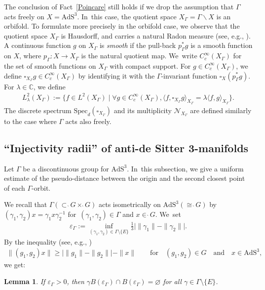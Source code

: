 \documentclass[10pt,a4paper]{amsart}
\numberwithin{equation}{section}
\newtheorem{Lemma}[Theorem]{Lemma}
\begin{document}
The conclusion of Fact~\ref{Poincare} still holds if
we drop the assumption that
$\Gamma$ acts freely on $X=\mathrm{AdS}^{3}$. In~this case, the quotient space $X_{\Gamma}=\Gamma\backslash X$ is an orbifold.
To formulate more precisely in the orbifold case, we observe that
the quotient space $X_{\Gamma}$ is Hausdorff, and carries a natural Radon measure
(see, e.g., \cite[Chapter~VII, Section~2, No.~2, Proposition~4]{Bourbaki-integral}).
A continuous function $g$ on $X_{\Gamma}$ is \textit{smooth} if
the pull-back $p_{\Gamma}^{*}g$ is a smooth function on $X$,
where $p_{\Gamma}\colon X\rightarrow X_{\Gamma}$ is the natural quotient
map. We~write $C_{c}^{\infty}(X_{\Gamma})$
for the set of smooth functions on $X_{\Gamma}$ with compact support.
For $g\in C_{c}^{\infty}(X_{\Gamma})$,
we define $\square_{X_{\Gamma}}g \in C_{c}^{\infty}(X_{\Gamma})$ by identifying it with
the $\Gamma$-invariant function $\square_{X}(p_{\Gamma}^{*}g)$.
For $\lambda\in \mathbb{C}$, we define
\begin{gather*}
L^{2}_{\lambda}(X_{\Gamma}) :=
\big\{f\in L^{2}(X_{\Gamma})\mid \forall g\in C_{c}^{\infty}(X_{\Gamma}),
\langle f,\square_{X_{\Gamma}} g\rangle_{X_{\Gamma}}=\lambda\langle f,g\rangle_{X_{\Gamma}}\big\}.
\end{gather*}
The discrete spectrum $\mathrm{Spec}_{d}(\square_{X_{\Gamma}})$ and
its multiplicity $\mathcal{N}_{X_{\Gamma}}$ are defined similarly
to the case where $\Gamma$ acts also freely.

\subsection{``Injectivity radii'' of anti-de Sitter 3-manifolds}\label{inj-radii}
Let $\Gamma$ be a discontinuous group for $\mathrm{AdS}^{3}$. In~this subsection, we give a uniform estimate of the pseudo-distance
between the origin and the second closest point of each $\Gamma$-orbit.

We recall that $\Gamma(\subset \grave{\ }G\times\grave{\ }G)$
acts isometrically on $\mathrm{AdS}^{3}(\cong\grave{\ }G)$ by
$(\gamma_{1},\gamma_{2})x=\gamma_{1} x\gamma_{2}^{-1}$
for~$(\gamma_{1},\gamma_{2})\in\Gamma$ and $x\in\grave{\ }G$. We~set
\begin{align}
\label{varepsilon}
\varepsilon_{\Gamma} := \inf_{(\gamma_1,\gamma_2)\in
\Gamma\setminus\{E\}}
\frac{1}{3}\big|\|\gamma_1\|-\|\gamma_2\|\big|.
\end{align}
By the inequality (see, e.g., \cite[Lemma~5.5]{Kan19})
\begin{gather*}
\|(g_1,g_2)x\|\geq \big | \|g_1\|-\|g_2\| \big | - \|x\|\qquad
\text{for}\quad (g_1,g_2) \in G \quad\text{and}\quad x \in \mathrm{AdS}^{3},
\end{gather*}
we get:
\begin{Lemma}\label{inj-rad}
If $\varepsilon_{\Gamma}>0$, then
$\gamma B(\varepsilon_{\Gamma}) \cap B(\varepsilon_{\Gamma})
= \varnothing$
for all $\gamma\in \Gamma\setminus\{E\}$.
\end{Lemma}
\end{document}
